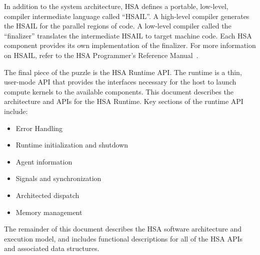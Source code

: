 \documentclass[final]{book}
\begin{document}
In addition to the system architecture, HSA defines a portable, low-level,
compiler intermediate language called ``HSAIL''.  A high-level compiler generates
the HSAIL for the parallel regions of code. A low-level compiler called the
``finalizer'' translates the intermediate HSAIL to target machine code.  Each
HSA component provides its own implementation of the finalizer.  For more
information on HSAIL, refer to the HSA Programmer's Reference Manual~\cite{prm}.

The final piece of the puzzle is the HSA Runtime API.  The runtime is a thin,
user-mode API that provides the interfaces necessary for the host to launch
compute kernels to the available components. This document describes the
architecture and APIs for the HSA Runtime. Key sections of the runtime API
include:
\begin{itemize}
\item Error Handling
\item Runtime initialization and shutdown
\item Agent information
\item Signals and synchronization
\item Architected dispatch
\item Memory management
\end{itemize}

The remainder of this document describes the HSA software architecture and
execution model, and includes functional descriptions for all of the HSA APIs
and associated data structures.
\end{document}
